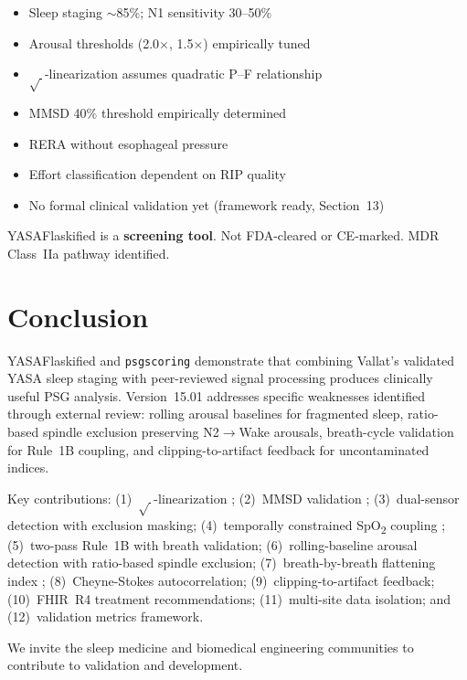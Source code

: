 \documentclass[11pt,a4paper,twocolumn]{article}
\begin{document}
\begin{itemize}[nosep,leftmargin=1.5em]
  \item Sleep staging $\sim$85\%; N1 sensitivity 30--50\% \cite{rosenberg2013}
  \item Arousal thresholds (2.0$\times$, 1.5$\times$) empirically tuned
  \item $\sqrt{\,}$-linearization assumes quadratic P--F relationship \cite{thurnheer2001}
  \item MMSD 40\% threshold empirically determined
  \item RERA without esophageal pressure
  \item Effort classification dependent on RIP quality
  \item No formal clinical validation yet (framework ready, Section~13)
\end{itemize}

\noindent YASAFlaskified is a \textbf{screening tool}. Not FDA-cleared or CE-marked. MDR Class~IIa pathway identified.


\section{Conclusion}

YASAFlaskified and \texttt{psgscoring} demonstrate that combining Vallat's validated YASA sleep staging with peer-reviewed signal processing produces clinically useful PSG analysis. Version~15.01 addresses specific weaknesses identified through external review: rolling arousal baselines for fragmented sleep, ratio-based spindle exclusion preserving N2$\to$Wake arousals, breath-cycle validation for Rule~1B coupling, and clipping-to-artifact feedback for uncontaminated indices.

Key contributions: (1)~$\sqrt{\,}$-linearization \cite{monserrat2001,thurnheer2001}; (2)~MMSD validation \cite{lee2008}; (3)~dual-sensor detection with exclusion masking; (4)~temporally constrained SpO\textsubscript{2} coupling \cite{uddin2021}; (5)~two-pass Rule~1B with breath validation; (6)~rolling-baseline arousal detection with ratio-based spindle exclusion; (7)~breath-by-breath flattening index \cite{hosselet1998}; (8)~Cheyne-Stokes autocorrelation; (9)~clipping-to-artifact feedback; (10)~FHIR~R4 treatment recommendations; (11)~multi-site data isolation; and (12)~validation metrics framework.

We invite the sleep medicine and biomedical engineering communities to contribute to validation and development.
\end{document}
